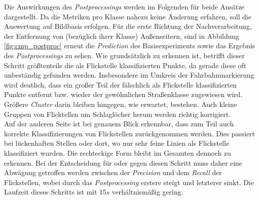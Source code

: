 Die Auswirkungen des \textit{Postprocessings} werden im Folgenden für beide Ansätze dargestellt. Da die Metriken pro Klasse nahezu keine Änderung erfahren, soll die Auswertung auf Bildbasis erfolgen.
Für die erste Richtung der Nachverarbeitung, der Entfernung von (bezüglich ihrer Klasse) Außenseitern, sind in Abbildung \ref{fig:cmp_postproc} erneut die \textit{Prediction} des Basisexperiments sowie das Ergebnis des \textit{Postprocessings} zu sehen. Wie grundsätzlich zu erkennen ist, betrifft dieser Schritt größtenteils die als Flickstelle klassifizierten Punkte, da gerade diese oft unbeständig gefunden werden. Insbesondere im Umkreis der Fahrbahnmarkierung wird deutlich, dass ein großer Teil der fälschlich als Flickstelle klassifizierten Punkte entfernt bzw. wieder der gewöhnlichen Straßenklasse zugewiesen wird. Größere \textit{Cluster} darin bleiben hingegen, wie erwartet, bestehen. Auch kleine Gruppen von Flicktellen um Schlaglöcher herum werden richtig korrigiert. \\
Auf der anderen Seite ist bei genauem Blick erkennbar, dass zum Teil auch korrekte Klassifizierungen von Flickstellen zurückgenommen werden. Dies passiert bei lückenhaften Stellen oder dort, wo nur sehr feine Linien als Flickstelle klassifiziert wurden. Die rechteckige Form bleibt im Gesamten dennoch zu erkennen. Bei der Entscheidung für oder gegen diesen Schritt muss daher eine Abwägung getroffen werden zwischen der \textit{Precision} und dem \textit{Recall} der Flickstellen, wobei durch das \textit{Postprocessing} erstere steigt und letzterer sinkt. Die Laufzeit dieses Schritts ist mit 15$s$ verhältnismäßig gering. \\

